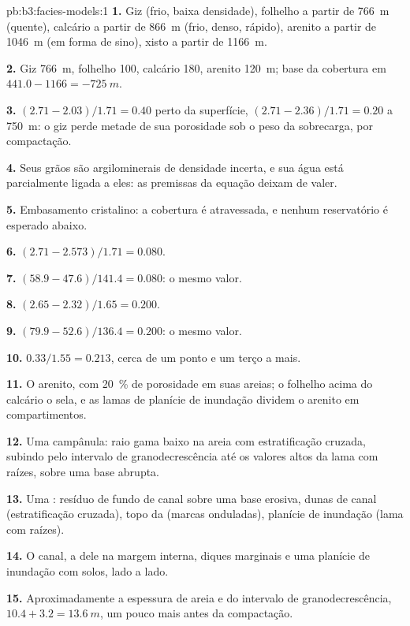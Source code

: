 \begin{solution}{pb:b3:facies-models:1}
\textbf{1.} Giz (frio, baixa densidade), folhelho a partir de \qty{766}{m} (quente), calcário a partir de
\qty{866}{m} (frio, denso, rápido), arenito a partir de \qty{1046}{m} (em forma de
sino), xisto a partir de \qty{1166}{m}.

\textbf{2.} Giz \qty{766}{m}, folhelho 100, calcário 180, arenito
\qty{120}{m}; base da cobertura em $441.0 - 1166 = \qty{-725}{m}$.

\textbf{3.} $(2.71 - 2.03)/1.71 = 0.40$ perto da superfície, $(2.71 -
2.36)/1.71 = 0.20$ a \qty{750}{m}: o giz perde metade de sua porosidade
sob o peso da sobrecarga, por compactação.

\textbf{4.} Seus grãos são argilominerais de densidade incerta, e sua água está
parcialmente ligada a eles: as premissas da equação deixam de valer.

\textbf{5.} Embasamento cristalino: a cobertura é atravessada, e nenhum reservatório é
esperado abaixo.

\textbf{6.} $(2.71 - 2.573)/1.71 = 0.080$.

\textbf{7.} $(58.9 - 47.6)/141.4 = 0.080$: o mesmo valor.

\textbf{8.} $(2.65 - 2.32)/1.65 = 0.200$.

\textbf{9.} $(79.9 - 52.6)/136.4 = 0.200$: o mesmo valor.

\textbf{10.} $0.33/1.55 = 0.213$, cerca de um ponto e um terço a mais.

\textbf{11.} O arenito, com \qty{20}{\percent} de porosidade em suas areias;
o folhelho acima do calcário o sela, e as lamas de planície de inundação
dividem o arenito em compartimentos.

\textbf{12.} Uma campânula: raio gama baixo na areia com estratificação cruzada, subindo
pelo intervalo de granodecrescência até os valores altos da lama com raízes, sobre uma base abrupta.

\textbf{13.} Uma : resíduo de fundo de canal sobre uma
base erosiva, dunas de canal (estratificação cruzada), topo da  (marcas onduladas), planície de inundação
(lama com raízes).

\textbf{14.} O canal, a  dele na margem interna, diques marginais e uma
planície de inundação com solos, lado a lado.

\textbf{15.} Aproximadamente a espessura de areia e do intervalo de granodecrescência, $10.4 + 3.2 =
\qty{13.6}{m}$, um pouco mais antes da compactação.


\end{solution}
